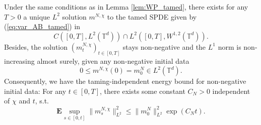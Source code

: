 \begin{cor}\label{cor:lift_tamed equation}Under the same conditions as in Lemma \ref{lem:WP_tamed}, there exists for any $T > 0$ a unique $L^2$ solution $m^{N,\chi}$ to the tamed SPDE given by (\ref{eq:var_AB_tamed}) in 
\[
C([0,T], L^2(\mathbb{T}^d)) \cap L^2([0,T],W^{1,2}(\mathbb{T}^d)).
\]
Besides, the solution $(m_t^{N,\chi})_{t \in [0,T]}$ stays non-negative and the $L^1$ norm is non-increasing almost surely, given any non-negative initial data 
\[
0 \leq m^{N,\chi}(0) = m_0^{N} \in L^2(\mathbb{T}^d).
\]
Consequently, we have the taming-independent energy bound for  non-negative initial data: For any $t \in [0,T]$, there exists some constant $C_N > 0$ independent of $\chi$ and $t$, s.t. 
\begin{equation}\label{eq:post_H-1_tamed}
    \mathbf{E}\sup_{s \in [0,t]}\|m_s^{N,\chi}\|^2_{L^2} \leq  \|m_0^{N}\|^2_{L^2}\exp(C_Nt).
\end{equation}
\end{cor}





